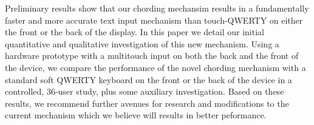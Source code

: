 Preliminary results show that our chording mechansim results in a
fundamentally faster and more accurate text input mechanism than
touch-QWERTY on either the front or the back of the display.  In this
paper we detail our initial quantitative and qualitative investigation
of this new mechanism.  Using a hardware prototype with a multitouch
input on both the back and the front of the device, we compare the
performance of the novel chording mechanism with a standard soft
QWERTY keyboard on the front or the back of the device in a
controlled, 36-user study, plus some auxiliary investigation.  Based
on these results, we recommend further avenues for research and
modifications to the current mechanism which we believe will results
in better peformance.
